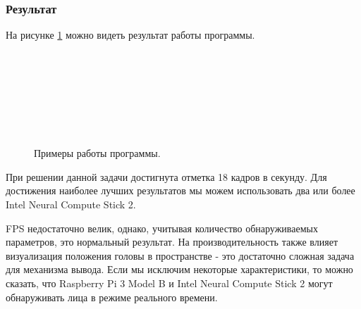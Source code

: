 \documentclass[12pt,a4paper]{scrartcl}
\begin{document}
		\subsubsection{Результат}
		
			На рисунке \ref{fig:Face_Detection_Examples} можно видеть результат работы программы.
			
			\begin{figure}[H]
				\begin{minipage}[h]{0.47\linewidth}
					 \hspace{0.1cm} \\
				\end{minipage}
				\hfill
				\begin{minipage}[h]{0.47\linewidth}
					 \hspace{0.1cm} \\
				\end{minipage}
				\vfill
				\begin{minipage}[h]{0.47\linewidth}
					 \\
				\end{minipage}
				\hfill
				\begin{minipage}[h]{0.47\linewidth}
					 \\
				\end{minipage}
				\caption{Примеры работы программы.}
				\label{fig:Face_Detection_Examples}
			\end{figure}
		
			При решении данной задачи достигнута отметка 18 кадров в секунду. Для достижения наиболее лучших результатов мы можем использовать два или более Intel Neural Compute Stick 2. 
			
			FPS недостаточно велик, однако, учитывая количество обнаруживаемых параметров, это нормальный результат. На производительность также влияет визуализация положения головы в пространстве - это достаточно сложная задача для механизма вывода. Если мы исключим некоторые характеристики, то можно сказать, что Raspberry Pi 3 Model B и Intel Neural Compute Stick 2 могут обнаруживать лица в режиме реального времени.
	
\end{document}
